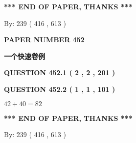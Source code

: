 \documentclass{ctexart}
\begin{document}
   
 \vspace{0.2in}
 
   
   
   
   
\vspace{1.0in} 
{\textbf{\large{ *** END OF PAPER, THANKS *** }}} 
   
   
\hspace{1.0in} By: 
 239 ( 416 ,  613 )
   
   
   
   
\newpage 
\setcounter{page}{ 
   452001 } 
   
   
   
   
 {\textbf{ \Large{ PAPER NUMBER  452  }}}
   
   
\vspace{0.2in}
   
   
   
   
   
   
 \vspace{0.2in}
{\LARGE {\textbf{ 一个快速卷例}}}
   
   
  
\vspace{0.2in}
  
{\textbf{\Large{QUESTION
452.1 
 ( 2 , 2 , 201 )
}}}
  
  
  
\vspace{0.2in}
  
{\textbf{\Large{QUESTION
452.2 
 ( 1 , 1 , 101 )
}}}
  
  
 
 

$ %
42 +  %
40=   %
82$
 
 
   
   
 \vspace{0.2in}
 
   
   
   
   
\vspace{1.0in} 
{\textbf{\large{ *** END OF PAPER, THANKS *** }}} 
   
   
\hspace{1.0in} By: 
 239 ( 416 ,  613 )
   
   
   
   
\newpage 
\setcounter{page}{ 
   453001 } 
   
   
   
\end{document}
